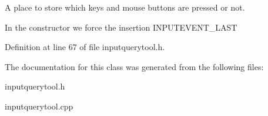 A place to store which keys and mouse buttons are pressed or not. 

In the constructor we force the insertion INPUTEVENT\_\-LAST 

Definition at line 67 of file inputquerytool.h.



The documentation for this class was generated from the following files:\begin{DoxyCompactItemize}
\item 
inputquerytool.h\item 
inputquerytool.cpp\end{DoxyCompactItemize}
